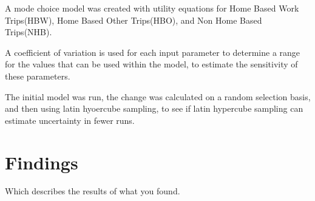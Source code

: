 \documentclass[3p, authoryear, review]{elsarticle} %
\begin{document}
A mode choice model was created with utility equations for Home Based Work Trips(HBW), Home Based Other Trips(HBO), and Non Home Based Trips(NHB).

A coefficient of variation is used for each input parameter to determine a range for the values that can be used within the model, to estimate the sensitivity of these parameters.

The initial model was run, the change was calculated on a random selection basis, and then using latin hyoercube sampling, to see if latin hypercube sampling can estimate uncertainty in fewer runs.

\hypertarget{findings}{%
\section{Findings}\label{findings}}

Which describes the results of what you found.


\end{document}

